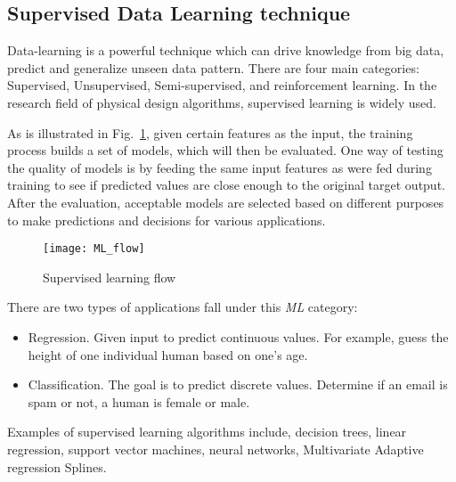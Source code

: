 \subsection{Supervised Data Learning technique}
Data-learning is a powerful technique which can drive knowledge from big data, predict and generalize unseen data pattern. There are four main categories: Supervised, Unsupervised, Semi-supervised, and reinforcement learning. In the research field of physical design algorithms, supervised learning is widely used.

As is illustrated in Fig.~\ref{fig:ml_flow}, given certain features as the input, the training process builds a set of models, which will then be evaluated. One way of testing the quality of models is by feeding the same input features as were fed during training to see if predicted values are close enough to the original target output. After the evaluation, acceptable models are selected based on different purposes to make predictions and decisions for various applications. 
\begin{figure}[htbp]
	\centerline{\texttt{[image: ML\_flow]}}
	\caption{Supervised learning flow}
	\label{fig:ml_flow}
\end{figure}
There are two types of applications fall under this \textit{ML} category:
\begin{itemize}
\item Regression. Given input to predict continuous values. For example, guess the height of one individual human based on one's age. 
\item Classification. The goal is to predict discrete values. Determine if an email is spam or not, a human is female or male. 
\end{itemize}

Examples of supervised learning algorithms include, decision trees, linear regression, support vector machines, neural networks, Multivariate Adaptive regression Splines.
